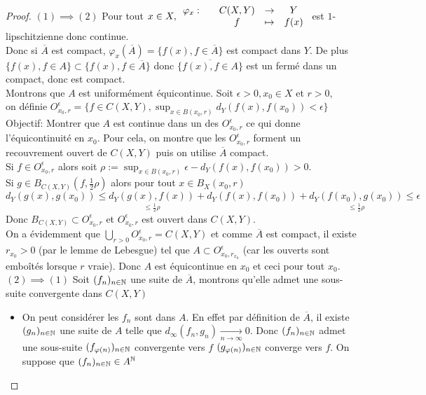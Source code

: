 \documentclass[]{report}
\begin{document}
    \begin{proof}
        $(1)\implies (2)$ Pour tout $x\in X, \begin{array}{ccccc} \varphi_x : & & C(X,Y) & \to & Y \\ & & f & \mapsto & f(x) \end{array}$ est $1$-lipschitzienne donc continue.\\
        Donc si $\overline{A}$ est compact, $\varphi_x(\overline{A})=\{f(x),f\in \overline{A}\}$ est compact dans $Y$. De plus $\{f(x),f\in A\}\subset \{f(x),f\in \overline{A}\}$ donc $\overline{\{f(x),f\in A\}}$ est un fermé dans un compact, donc est compact.\\
        Montrons que $A$ est uniformément équicontinue. Soit $\epsilon>0,x_0\in X$ et $r>0$, \\
        on définie $O_{x_0,r}^\epsilon=\{f\in C(X,Y),\sup_{x\in B(x_0,r)} d_Y(f(x),f(x_0))<\epsilon\}$\\
        Objectif: Montrer que $A$ est continue dans un des $O_{x_0,r}^\epsilon$ ce qui donne l'équicontinuité en $x_0$. Pour cela, on montre que les $O_{x_0,r}^\epsilon$ forment un recouvrement ouvert de $C(X,Y)$ puis on utilise $\overline{A}$ compact.\\
        Si $f\in O_{x_0,r}^\epsilon$ alors soit $\rho:=\sup_{x\in B(x_0,r)}\epsilon -d_Y(f(x),f(x_0))>0$.\\
        Si $g\in B_{C(X,Y)}(f,\frac{1}{2}\rho)$ alors pour tout $x\in B_X(x_0,r)$
        \[d_Y(g(x),g(x_0))\le \underset{\le \frac{1}{2}\rho}{d_Y(g(x),f(x))}+d_Y(f(x),f(x_0))+\underset{\le \frac{1}{2}\rho}{d_Y(f(x_0),g(x_0))}\le \epsilon\]
        Donc $B_{C(X,Y)}\subset O_{x_0,r}^\epsilon$ et $O_{x_0,r}^\epsilon$ est ouvert dans $C(X,Y)$.\\
        On a évidemment que $\bigcup_{r>0}O_{x_0,r}^\epsilon=C(X,Y)$ et comme $\overline{A}$ est compact, il existe $r_{x_0}>0$ (par le lemme de Lebesgue) tel que $A\subset O_{x_0,r_{x_0}}^\epsilon$ (car les ouverts sont emboîtés lorsque $r$ vraie). Donc $A$ est équicontinue en $x_0$ et ceci pour tout $x_0$.\\
        $(2)\implies (1)$ Soit $(f_n)_{n\in\mathbb{N}}$ une suite de $\overline{A}$, montrons qu'elle admet une sous-suite convergente dans $C(X,Y)$
        \begin{itemize}
            \item On peut considérer les $f_n$ sont dans $A$. En effet par définition de $\overline{A}$, il existe $(g_n)_{n\in\mathbb{N}}$ une suite de $A$ telle que $d_\infty(f_n,g_n)\underset{n\to\infty}{\longrightarrow}0$. Donc $(f_n)_{n\in\mathbb{N}}$ admet une sous-suite $(f_{\varphi(n)})_{n\in\mathbb{N}}$ convergente vers $f$ \ssi $(g_{\varphi(n)})_{n\in\mathbb{N}}$ converge vers $f$. On suppose que $(f_n)_{n\in\mathbb{N}}\in A^{\mathbb{N}}$

\end{itemize}
\end{proof}
\end{document}
